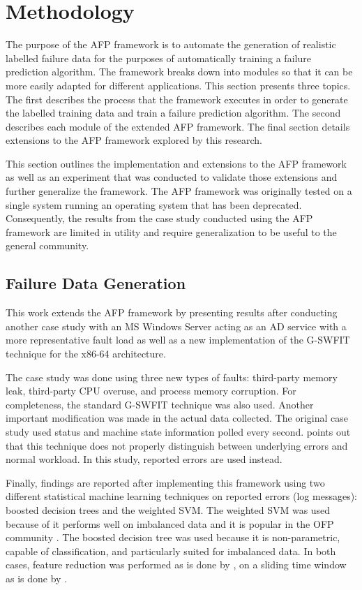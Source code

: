 \section{Methodology} \label{chapter3}
The purpose of the \ac{AFP} framework is to automate the generation of
realistic labelled failure data for the purposes of automatically training a
failure prediction algorithm.  The framework breaks down into modules so that
it can be more easily adapted for different applications.  This section
presents three topics.  The first describes the process that the framework
executes in order to generate the labelled training data and train a failure
prediction algorithm.  The second describes each module of the extended
\ac{AFP} framework.  The final section details extensions to the \ac{AFP}
framework explored by this research.

This section outlines the implementation and extensions to the \ac{AFP}
framework \citep{irrera2015} as well as an experiment that was conducted to
validate those extensions and further generalize the framework.  The \ac{AFP}
framework was originally tested on a single system running an operating system
that has been deprecated.  Consequently, the results from the case study
conducted using the \ac{AFP} framework are limited in utility and require
generalization to be useful to the general community.

\subsection{Failure Data Generation} \label{sec:generation}
This work extends the \ac{AFP} framework \citep{irrera2015} by presenting
results after conducting another case study with an \ac{MS} Windows Server
acting as an \ac{AD} service with a more representative fault load as well as a
new implementation of the \ac{G-SWFIT} technique for the x86-64 architecture.

The case study was done using three new types of faults: third-party memory
leak, third-party \ac{CPU} overuse, and process memory corruption.  For
completeness, the standard \ac{G-SWFIT} technique was also used.  Another
important modification was made in the actual data collected.  The original
case study used status and machine state information polled every second.
\citet{salfnerSurvey} points out that this technique does not properly
distinguish between underlying errors and normal workload.  In this study,
reported errors are used instead.

Finally, findings are reported after implementing this framework using two
different statistical machine learning techniques on reported errors (log
messages): boosted decision trees and the weighted \ac{SVM}.  The weighted
\ac{SVM} was used because of it performs well on imbalanced data and it is
popular in the \ac{OFP} community \citep{salfnerSurvey}.  The boosted decision
tree was used because it is non-parametric, capable of classification, and
particularly suited for imbalanced data.  In both cases, feature reduction was
performed as is done by \citet{fulp2008}, on a sliding time window as is done
by \citet{irrera2013a,vaarandi2002}.

